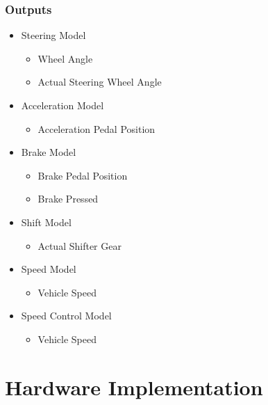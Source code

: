 \documentclass[12pt]{article} %
\begin{document}
\subsubsection{Outputs}

\begin{itemize}
    \item Steering Model
    \begin{itemize}
    		\item Wheel Angle
    		\item Actual Steering Wheel Angle
    \end{itemize}
    \item Acceleration Model
    \begin{itemize}
    		\item Acceleration Pedal Position
    \end{itemize}
    \item Brake Model
    \begin{itemize}
    		\item Brake Pedal Position
    		\item Brake Pressed
    \end{itemize}
    \item Shift Model
    \begin{itemize}
    		\item Actual Shifter Gear
    \end{itemize}
    \item Speed Model
    \begin{itemize}
    		\item Vehicle Speed
    \end{itemize}
    \item Speed Control Model
    \begin{itemize}
    		\item Vehicle Speed
    \end{itemize}
\end{itemize}

\section{Hardware Implementation}
\end{document}
